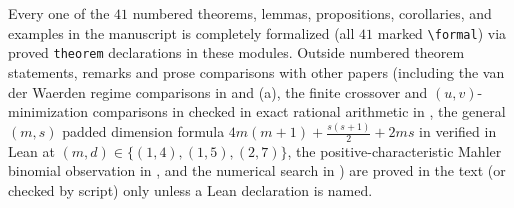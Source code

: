 Every one of the $41$ numbered theorems, lemmas, propositions, corollaries, and examples in the
manuscript is completely formalized (all $41$ marked \verb|\formal|) via proved \texttt{theorem}
declarations in these modules. Outside numbered theorem statements, remarks and prose comparisons with
other papers (including the van der Waerden regime comparisons in  and
(a), the finite crossover and $(u,v)$-minimization comparisons in
 checked in exact rational arithmetic in
, the general $(m, s)$ padded dimension formula
$4m(m+1) + \frac{s(s+1)}{2} + 2ms$ in  verified in Lean at
$(m, d) \in \{(1,4), (1,5), (2,7)\}$, the positive-characteristic Mahler binomial observation in
, and the numerical search in ) are proved in
the text (or checked by script) only unless a Lean declaration is named.
